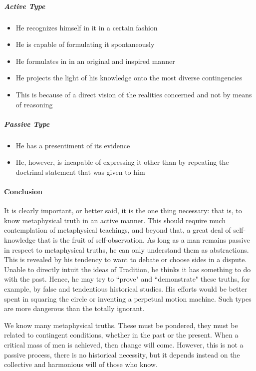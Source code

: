 \subparagraph{Active Type}
\begin{itemize}
\item He recognizes himself in it in a certain fashion 
\item He is capable of formulating it spontaneously 
\item He formulates in in an original and inspired manner 
\item He projects the light of his knowledge onto the most diverse contingencies 
\item This is because of a direct vision of the realities concerned and not by means of reasoning 
\end{itemize}
\subparagraph{Passive Type}
\begin{itemize}
\item He has a presentiment of its evidence 
\item He, however, is incapable of expressing it other than by repeating the doctrinal statement that was given to him 
\end{itemize}
\paragraph{Conclusion}
It is clearly important, or better said, it is the one thing necessary: that is, to know metaphysical truth in an active manner. This should require much contemplation of metaphysical teachings, and beyond that, a great deal of self-knowledge that is the fruit of self-observation. As long as a man remains passive in respect to metaphysical truths, he can only understand them as abstractions. This is revealed by his tendency to want to debate or choose sides in a dispute. Unable to directly intuit the ideas of Tradition, he thinks it has something to do with the past. Hence, he may try to ``prove" and ``demonstrate" these truths, for example, by false and tendentious historical studies. His efforts would be better spent in squaring the circle or inventing a perpetual motion machine. Such types are more dangerous than the totally ignorant.

We know many metaphysical truths. These must be pondered, they must be related to contingent conditions, whether in the past or the present. When a critical mass of men is achieved, then change will come. However, this is not a passive process, there is no historical necessity, but it depends instead on the collective and harmonious will of those who know.




